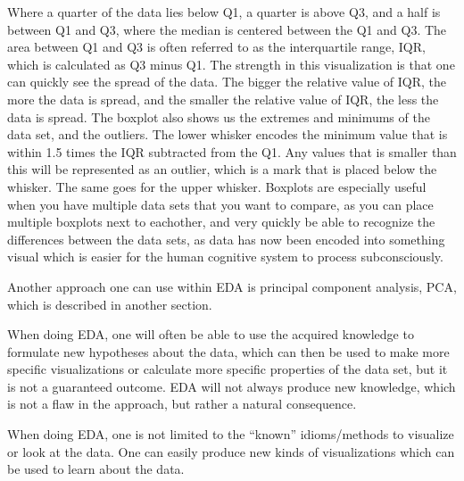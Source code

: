 \documentclass[Report.tex]{subfiles}
\begin{document}
Where a quarter of the data lies below Q1, a quarter is above Q3, and a half is between Q1 and Q3, where the median is centered between
the Q1 and Q3. The area between Q1 and Q3 is often referred to as the interquartile range, IQR, which is calculated as Q3 minus Q1. The strength in this visualization is that one can quickly see the spread of the data. The bigger the relative value of IQR, the more the data is spread, and the smaller the relative value of IQR, the less the data is spread. The boxplot also shows us the extremes and minimums of the data set, and the outliers. The lower whisker encodes the minimum value that is within 1.5 times the IQR subtracted from the Q1. Any values that is smaller than this will be represented as an outlier, which is a mark that is placed below the whisker. The same goes for the upper whisker. Boxplots are especially useful when you have multiple data sets that you want to compare, as you can place multiple boxplots next to eachother, and very quickly be able to recognize the differences between the data sets, as data has now been encoded into something visual which is easier for the human cognitive system to process subconsciously.

Another approach one can use within EDA is principal component analysis, PCA, which is described in another section.

When doing EDA, one will often be able to use the acquired knowledge to formulate new hypotheses about the data, which can then
be used to make more specific visualizations or calculate more specific properties of the data set, but it
is not a guaranteed outcome. EDA will not always produce new knowledge, which is not a flaw in the approach,
but rather a natural consequence.

When doing EDA, one is not limited to the ``known'' idioms/methods to visualize or look at the data. One can easily
produce new kinds of visualizations which can be used to learn about the data.


\end{document}

